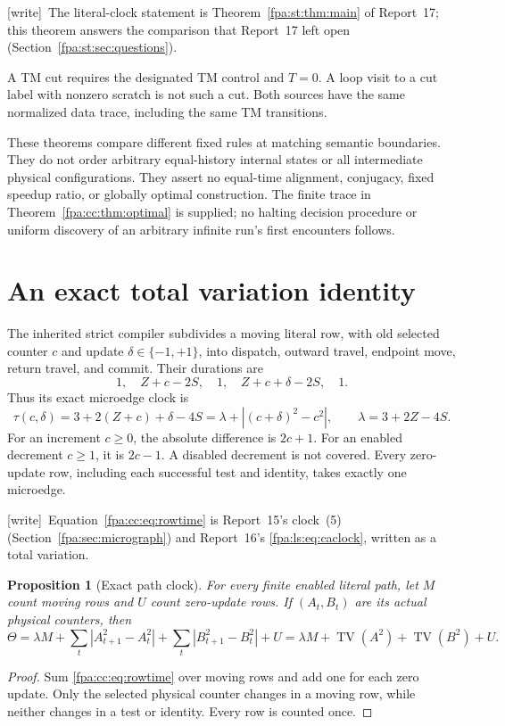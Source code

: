 \documentclass[11pt,a4paper]{article}
\numberwithin{equation}{section}
\newtheorem{proposition}[theorem]{Proposition}
\newcommand{\TV}{\operatorname{TV}}
\newcommand{\lam}{\lambda}
\newcommand{\wtag}{\textup{[write]}}
\begin{document}
\wtag\ The literal-clock statement is Theorem~\ref{fpa:st:thm:main} of Report~17; this theorem answers the comparison that Report~17 left open (Section~\ref{fpa:st:sec:questions}).

A TM cut requires the designated TM control and $T=0$. A loop visit to a
cut label with nonzero scratch is not such a cut. Both sources have the
same normalized data trace, including the same TM transitions.

These theorems compare different fixed rules at matching semantic
boundaries. They do not order arbitrary equal-history internal states or
all intermediate physical configurations. They assert no equal-time
alignment, conjugacy, fixed speedup ratio, or globally optimal construction.
The finite trace in Theorem~\ref{fpa:cc:thm:optimal} is supplied; no halting decision
procedure or uniform discovery of an arbitrary infinite run's first
encounters follows.
\newpage

\section{An exact total variation identity}
\label{fpa:cc:sec:variation}
The inherited strict compiler subdivides a moving literal row, with old
selected counter $c$ and update $\delta\in\{-1,+1\}$, into dispatch,
outward travel, endpoint move, return travel, and commit. Their durations are
\[
 1,\quad Z+c-2S,\quad 1,\quad Z+c+\delta-2S,\quad 1.
\]
Thus its exact microedge clock is
\begin{equation}
 \tau(c,\delta)=3+2(Z+c)+\delta-4S
 =\lam+\left|(c+\delta)^2-c^2\right|,
 \qquad \lam=3+2Z-4S.
 \label{fpa:cc:eq:rowtime}
\end{equation}
For an increment $c\geq0$, the absolute difference is $2c+1$. For an enabled
decrement $c\geq1$, it is $2c-1$. A disabled decrement is not covered.
Every zero-update row, including each successful test and identity, takes
exactly one microedge.

\wtag\ Equation~\eqref{fpa:cc:eq:rowtime} is Report~15's clock~(5) (Section~\ref{fpa:sec:micrograph}) and Report~16's \eqref{fpa:ls:eq:caclock}, written as a total variation.

\begin{proposition}[Exact path clock]
\label{fpa:cc:prop:tv}
For every finite enabled literal path, let $M$ count moving rows and $U$
count zero-update rows. If $(A_t,B_t)$ are its actual physical counters, then
\begin{equation}
 \Theta=\lam M+\sum_t|A_{t+1}^2-A_t^2|
                   +\sum_t|B_{t+1}^2-B_t^2|+U
       =\lam M+\TV(A^2)+\TV(B^2)+U.
 \label{fpa:cc:eq:tv}
\end{equation}
\end{proposition}
\begin{proof}
Sum \eqref{fpa:cc:eq:rowtime} over moving rows and add one for each zero update.
Only the selected physical counter changes in a moving row, while neither
changes in a test or identity. Every row is counted once.
\end{proof}
\end{document}
